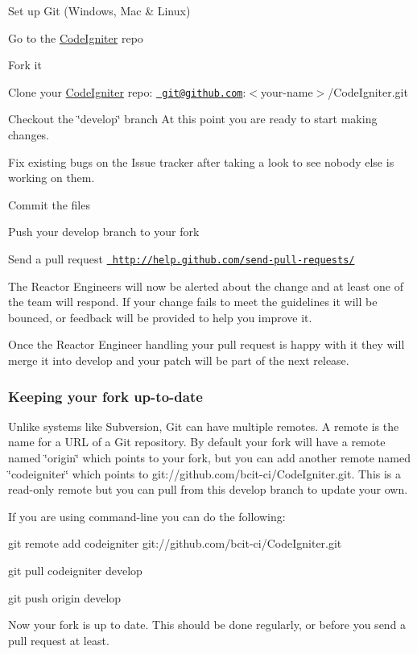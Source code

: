 \begin{DoxyEnumerate}
\item Set up Git (Windows, Mac \& Linux)
\item Go to the \mbox{\hyperlink{a00009}{Code\+Igniter}} repo
\item Fork it
\item Clone your \mbox{\hyperlink{a00009}{Code\+Igniter}} repo\+: \href{mailto:git@github.com}{\texttt{ git@github.\+com}}\+:$<$your-\/name$>$/\+Code\+Igniter.git
\item Checkout the \char`\"{}develop\char`\"{} branch At this point you are ready to start making changes.
\item Fix existing bugs on the Issue tracker after taking a look to see nobody else is working on them.
\item Commit the files
\item Push your develop branch to your fork
\item Send a pull request \href{http://help.github.com/send-pull-requests/}{\texttt{ http\+://help.\+github.\+com/send-\/pull-\/requests/}}
\end{DoxyEnumerate}

The Reactor Engineers will now be alerted about the change and at least one of the team will respond. If your change fails to meet the guidelines it will be bounced, or feedback will be provided to help you improve it.

Once the Reactor Engineer handling your pull request is happy with it they will merge it into develop and your patch will be part of the next release.

\subsubsection*{Keeping your fork up-\/to-\/date}

Unlike systems like Subversion, Git can have multiple remotes. A remote is the name for a U\+RL of a Git repository. By default your fork will have a remote named \char`\"{}origin\char`\"{} which points to your fork, but you can add another remote named \char`\"{}codeigniter\char`\"{} which points to {\ttfamily git\+://github.com/bcit-\/ci/\+Code\+Igniter.\+git}. This is a read-\/only remote but you can pull from this develop branch to update your own.

If you are using command-\/line you can do the following\+:


\begin{DoxyEnumerate}
\item {\ttfamily git remote add codeigniter git\+://github.com/bcit-\/ci/\+Code\+Igniter.\+git}
\item {\ttfamily git pull codeigniter develop}
\item {\ttfamily git push origin develop}
\end{DoxyEnumerate}

Now your fork is up to date. This should be done regularly, or before you send a pull request at least. 